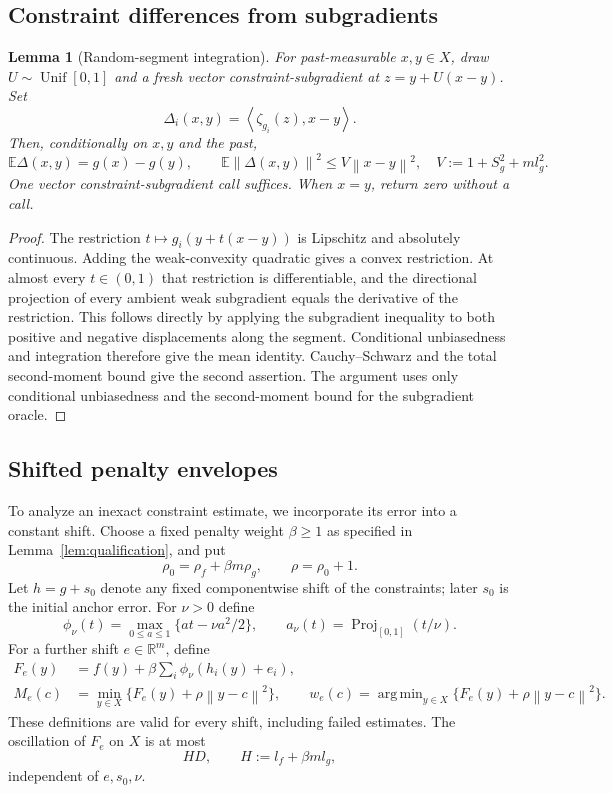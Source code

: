 \documentclass[11pt,a4paper]{article}
\newcommand{\R}{\mathbb R}
\newcommand{\E}{\mathbb E}
\newcommand{\norm}[1]{\left\lVert#1\right\rVert}
\newcommand{\ip}[2]{\left\langle#1,#2\right\rangle}
\DeclareMathOperator{\Proj}{Proj}
\DeclareMathOperator*{\argmin}{arg\,min}
\newtheorem{lemma}[theorem]{Lemma}
\theoremstyle{remark}
\numberwithin{equation}{section}
\begin{document}
\subsection{Constraint differences from subgradients}
\begin{lemma}[Random-segment integration]\label{lem:segment}
For past-measurable $x,y\in X$, draw $U\sim\operatorname{Unif}[0,1]$ and a fresh vector constraint-subgradient at $z=y+U(x-y)$. Set
\[
 \Delta_i(x,y)=\ip{\zeta_{g_i}(z)}{x-y}.
\]
Then, conditionally on $x,y$ and the past,
\begin{equation}
 \E\Delta(x,y)=g(x)-g(y),\qquad
 \E\norm{\Delta(x,y)}^2\le V\norm{x-y}^2,
 \quad V:=1+S_g^2+m l_g^2.
 \label{eq:segment}
\end{equation}
One vector constraint-subgradient call suffices. When $x=y$, return zero without a call.
\end{lemma}
\begin{proof}
The restriction $t\mapsto g_i(y+t(x-y))$ is Lipschitz and absolutely continuous. Adding the weak-convexity quadratic gives a convex restriction. At almost every $t\in(0,1)$ that restriction is differentiable, and the directional projection of every ambient weak subgradient equals the derivative of the restriction. This follows directly by applying the subgradient inequality to both positive and negative displacements along the segment. Conditional unbiasedness and integration therefore give the mean identity. Cauchy--Schwarz and the total second-moment bound give the second assertion. The argument uses only conditional unbiasedness and the second-moment bound for the subgradient oracle.
\end{proof}

\subsection{Shifted penalty envelopes}
To analyze an inexact constraint estimate, we incorporate its error into a constant shift. Choose a fixed penalty weight $\beta\ge1$ as specified in Lemma~\ref{lem:qualification}, and put
\[
 \rho_0=\rho_f+\beta m\rho_g,\qquad \rho=\rho_0+1.
\]
Let $h=g+s_0$ denote any fixed componentwise shift of the constraints; later $s_0$ is the initial anchor error. For $\nu>0$ define
\[
 \phi_\nu(t)=\max_{0\le a\le1}\{at-\nu a^2/2\},\qquad
 a_\nu(t)=\Proj_{[0,1]}(t/\nu).
\]
For a further shift $e\in\R^m$, define
\begin{align}
 F_e(y)&=f(y)+\beta\sum_i \phi_\nu(h_i(y)+e_i),\label{eq:shiftedF}\\
 M_e(c)&=\min_{y\in X}\{F_e(y)+\rho\norm{y-c}^2\},\qquad
 w_e(c)=\argmin_{y\in X}\{F_e(y)+\rho\norm{y-c}^2\}.
 \label{eq:shiftedenvelope}
\end{align}
These definitions are valid for every shift, including failed estimates. The oscillation of $F_e$ on $X$ is at most
\[
 H D,\qquad H:=l_f+\beta m l_g,
\]
independent of $e,s_0,\nu$.
\end{document}
